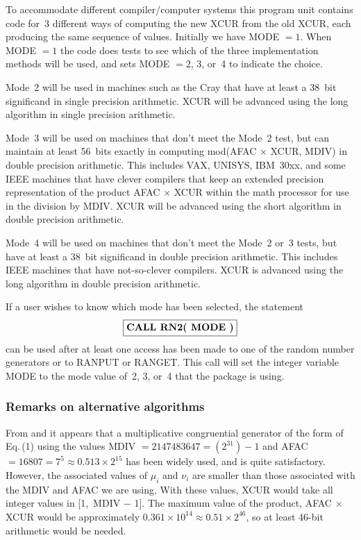 \documentclass[twoside]{MATH77}
\begin{document}
To accommodate different compiler/computer systems this program unit
contains code for~3 different ways of computing the new XCUR from the old
XCUR, each producing the same sequence of values. Initially we have MODE $=
1 $. When MODE $= 1$ the code does tests to see which of the three
implementation methods will be used, and sets MODE $= 2$, 3, or~4 to
indicate the choice.

Mode~2 will be used in machines such as the Cray that have at least a 38~bit
significand in single precision arithmetic. XCUR will be advanced using the long algorithm
in single precision arithmetic.

Mode~3 will be used on machines that don't meet the Mode~2 test, but can
maintain at least 56~bits exactly in computing mod(AFAC $\times $ XCUR,
MDIV) in double precision arithmetic. This includes VAX, UNISYS, IBM~30xx, and some IEEE
machines that have clever compilers that keep an extended precision
representation of the product AFAC $\times $ XCUR within the math processor
for use in the division by MDIV. XCUR will be advanced using the short
algorithm in double precision arithmetic.

Mode~4 will be used on machines that don't meet the Mode~2 or~3 tests, but
have at least a 38~bit significand in double precision arithmetic. This includes IEEE
machines that have not-so-clever compilers. XCUR is advanced using the long
algorithm in double precision arithmetic.

If a user wishes to know which mode has been selected, the statement
$$
\fbox{{\bf CALL RN2( MODE )}}
$$
can be used after at least one access has been made to one of the random
number generators or to RANPUT or RANGET. This call will set the integer
variable MODE to the mode value of~2, 3, or~4 that the package is using.

\subsubsection{Remarks on alternative algorithms}

From \cite{Learmonth:1973:STS} and \cite{Learmonth:1976:ETM} it appears
that a multiplicative congruential generator of the form of Eq.\,(1) using
the values MDIV $= 2147483647 = (2^{31}) - 1$ and AFAC $= 16807 = 7^5
\approx 0.513 \times 2^{15}$ has been widely used, and is quite
satisfactory.  However, the associated values of $\mu _i$ and $\nu _i$ are
smaller than those associated with the MDIV and AFAC we are using.  With
these values, XCUR would take all integer values in [1,\ MDIV $-$ 1].  The
maximum value of the product, AFAC $\times $ XCUR would be approximately
$0.361 \times 10^{14} \approx 0.51 \times 2^{46}$, so at least 46-bit
arithmetic would be needed.
\end{document}
